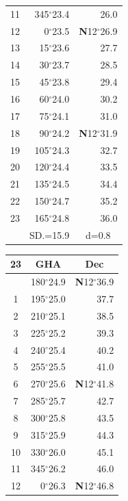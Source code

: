 \documentclass[10pt, a4paper]{report}
\begin{document}
\begin{scriptsize}
\begin{tabular*}{0.2\textwidth}[t]{@{\extracolsep{\fill}}|c|rr|}
11 & 345$^\circ$23.4 & 26.0\\[2Pt]
12 & 0$^\circ$23.5 & \textbf{N}12$^\circ$26.9\\
13 & 15$^\circ$23.6 & 27.7\\
14 & 30$^\circ$23.7 & 28.5\\
15 & 45$^\circ$23.8 & \raisebox{0.24ex}{\boldmath$\cdot$~\boldmath$\cdot$~~}29.4\\
16 & 60$^\circ$24.0 & 30.2\\
17 & 75$^\circ$24.1 & 31.0\\[2Pt]
18 & 90$^\circ$24.2 & \textbf{N}12$^\circ$31.9\\
19 & 105$^\circ$24.3 & 32.7\\
20 & 120$^\circ$24.4 & 33.5\\
21 & 135$^\circ$24.5 & \raisebox{0.24ex}{\boldmath$\cdot$~\boldmath$\cdot$~~}34.4\\
22 & 150$^\circ$24.7 & 35.2\\
23 & 165$^\circ$24.8 & 36.0\\
\hline
\rule{0pt}{2.4ex} & \multicolumn{1}{c}{SD.=15.9} & \multicolumn{1}{c|}{d=0.8}\\
\hline
\end{tabular*}\noindent
\begin{tabular*}{0.2\textwidth}[t]{@{\extracolsep{\fill}}|c|rr|}
\hline
\multicolumn{1}{|c|}{\rule{0pt}{2.6ex}\textbf{23}} & \multicolumn{1}{c}{\textbf{GHA}} & \multicolumn{1}{c|}{\textbf{Dec}}\\
\hline\rule{0pt}{2.6ex}\noindent
0 & 180$^\circ$24.9 & \textbf{N}12$^\circ$36.9\\
1 & 195$^\circ$25.0 & 37.7\\
2 & 210$^\circ$25.1 & 38.5\\
3 & 225$^\circ$25.2 & \raisebox{0.24ex}{\boldmath$\cdot$~\boldmath$\cdot$~~}39.3\\
4 & 240$^\circ$25.4 & 40.2\\
5 & 255$^\circ$25.5 & 41.0\\[2Pt]
6 & 270$^\circ$25.6 & \textbf{N}12$^\circ$41.8\\
7 & 285$^\circ$25.7 & 42.7\\
8 & 300$^\circ$25.8 & 43.5\\
9 & 315$^\circ$25.9 & \raisebox{0.24ex}{\boldmath$\cdot$~\boldmath$\cdot$~~}44.3\\
10 & 330$^\circ$26.0 & 45.1\\
11 & 345$^\circ$26.2 & 46.0\\[2Pt]
12 & 0$^\circ$26.3 & \textbf{N}12$^\circ$46.8\\

\end{tabular*}
\end{scriptsize}
\end{document}

